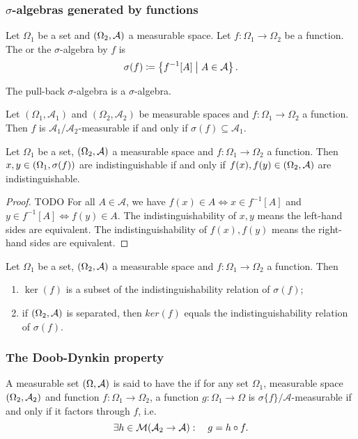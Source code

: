 \subsubsection{$\sigma$-algebras generated by functions}
\begin{definition}
Let $\Omega_1$ be a set and $\left( \Omega_2, \mathcal{A} \right)$ a measurable space. Let $f: \Omega_1\to \Omega_2$ be a function. The  or the $\sigma$-algebra  by $f$ is
\[ \sigma(f) \coloneqq \left\{ f^{-1}[A] \;\middle|\; A\in \mathcal{A} \right\}. \]
\end{definition}

The pull-back $\sigma$-algebra is a $\sigma$-algebra.

\begin{lemma}
Let $(\Omega_1, \mathcal{A}_1)$ and $(\Omega_2, \mathcal{A}_2)$ be measurable spaces and $f: \Omega_1\to \Omega_2$ a function. Then $f$ is $\mathcal{A}_1/\mathcal{A}_2$-measurable \textup{if and only if} $\sigma(f) \subseteq \mathcal{A}_1$.
\end{lemma}

\begin{lemma}
Let $\Omega_1$ be a set, $\left( \Omega_2, \mathcal{A} \right)$ a measurable space and $f: \Omega_1\to \Omega_2$ a function. Then $x,y\in \left( \Omega_1,\sigma(f) \right)$ are indistinguishable \textup{if and only if} $f(x), f(y) \in \left( \Omega_2,\mathcal{A} \right)$ are indistinguishable.
\end{lemma}
\begin{proof}
TODO For all $A\in\mathcal{A}$, we have $f(x)\in A \iff x\in f^{-1}[A]$ and $y\in f^{-1}[A]\iff f(y)\in A$. The indistinguishability of $x,y$ means the left-hand sides are equivalent. The indistinguishability of $f(x),f(y)$ means the right-hand sides are equivalent.
\end{proof}
\begin{corollary}
Let $\Omega_1$ be a set, $\left( \Omega_2, \mathcal{A} \right)$ a measurable space and $f: \Omega_1\to \Omega_2$ a function. Then
\begin{enumerate}
\item $\ker(f)$ is a subset of the indistinguishability relation of $\sigma(f)$;
\item if $\left( \Omega_2, \mathcal{A} \right)$ is separated, then $ker(f)$ equals the indistinguishability relation of $\sigma(f)$.
\end{enumerate}
\end{corollary}


\subsubsection{The Doob-Dynkin property}
\begin{definition}
A measurable set $\left( \Omega,\mathcal{A} \right)$ is said to have the  if for any set $\Omega_1$, measurable space $\left( \Omega_2,\mathcal{A}_2 \right)$ and function $f: \Omega_1 \to \Omega_2$, a function $g: \Omega_1\to \Omega$ is $\sigma\{f\}/\mathcal{A}$-measurable \textup{if and only if} it factors through $f$, i.e.
\[\exists h\in \operatorname{\mathcal{M}}(\mathcal{A}_2\to \mathcal{A}):\quad g = h\circ f. \]
\end{definition}

